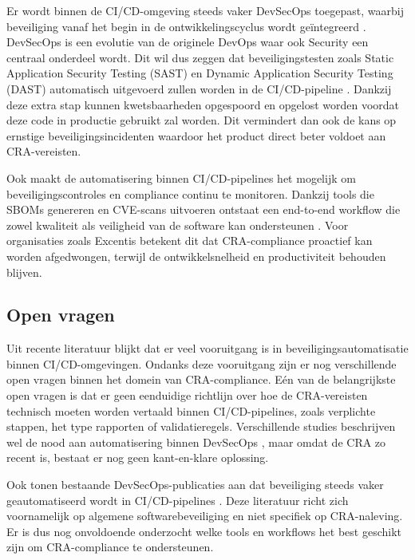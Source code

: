 Er wordt binnen de CI/CD-omgeving steeds vaker DevSecOps toegepast, waarbij beveiliging vanaf het begin in de ontwikkelingscyclus wordt geïntegreerd \parencite{RamdassJain2025}. DevSecOps is een evolutie van de originele DevOps waar ook Security een centraal onderdeel wordt. Dit wil dus zeggen dat beveiligingstesten zoals Static Application Security Testing (SAST) en Dynamic Application Security Testing (DAST) automatisch uitgevoerd zullen worden in de CI/CD-pipeline \parencite{Singh2025, Patel2024}. Dankzij deze extra stap kunnen kwetsbaarheden opgespoord en opgelost worden voordat deze code in productie gebruikt zal worden. Dit vermindert dan ook de kans op ernstige beveiligingsincidenten waardoor het product direct beter voldoet aan CRA-vereisten.

Ook maakt de automatisering binnen CI/CD-pipelines het mogelijk om beveiligingscontroles en compliance continu te monitoren. Dankzij tools die SBOMs genereren en CVE-scans uitvoeren ontstaat een end-to-end workflow die zowel kwaliteit als veiligheid van de software kan ondersteunen \parencite{OpenSSF2025SBOMCRA, Cheenepalli2025}. Voor organisaties zoals Excentis betekent dit dat CRA-compliance proactief kan worden afgedwongen, terwijl de ontwikkelsnelheid en productiviteit behouden blijven.

\subsection{Open vragen}

Uit recente literatuur blijkt dat er veel vooruitgang is in beveiligingsautomatisatie binnen CI/CD-omgevingen. Ondanks deze vooruitgang zijn er nog verschillende open vragen binnen het domein van CRA-compliance. Eén van de belangrijkste open vragen is dat er geen eenduidige richtlijn over hoe de CRA-vereisten technisch moeten worden vertaald binnen CI/CD-pipelines, zoals verplichte stappen, het type rapporten of validatieregels. Verschillende studies beschrijven wel de nood aan automatisering binnen DevSecOps \parencite{Singh2025,RamdassJain2025}, maar omdat de CRA zo recent is, bestaat er nog geen kant-en-klare oplossing.

Ook tonen bestaande DevSecOps-publicaties aan dat beveiliging steeds vaker geautomatiseerd wordt in CI/CD-pipelines \parencite{Singh2025,RamdassJain2025}. Deze literatuur richt zich voornamelijk op algemene softwarebeveiliging en niet specifiek op CRA-naleving. Er is dus nog onvoldoende onderzocht welke tools en workflows het best geschikt zijn om CRA-compliance te ondersteunen.

